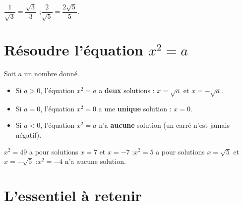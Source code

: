 \begin{exemple}
$\dfrac1{\sqrt3}=\dfrac{\sqrt3}{3}$ ;\quad $\dfrac2{\sqrt5}=\dfrac{2\sqrt5}5$.
\end{exemple}

\section{Résoudre l'équation \texorpdfstring{$x^{2}=a$}{x²=a}}

\begin{propriete}[Solutions de $x^{2}=a$]
Soit $a$ un nombre donné.
\begin{itemize}
\item Si $a>0$, l'équation $x^{2}=a$ a \textbf{deux} solutions : $x=\sqrt a$ et
$x=-\sqrt a$.
\item Si $a=0$, l'équation $x^{2}=0$ a une \textbf{unique} solution : $x=0$.
\item Si $a<0$, l'équation $x^{2}=a$ n'a \textbf{aucune} solution (un carré n'est jamais
négatif).
\end{itemize}
\end{propriete}

\begin{illus}
\end{illus}

\begin{exemple}
$x^{2}=49$ a pour solutions $x=7$ et $x=-7$ ;\quad $x^{2}=5$ a pour solutions $x=\sqrt5$ et
$x=-\sqrt5$ ;\quad $x^{2}=-4$ n'a aucune solution.
\end{exemple}

\section{L'essentiel à retenir}

